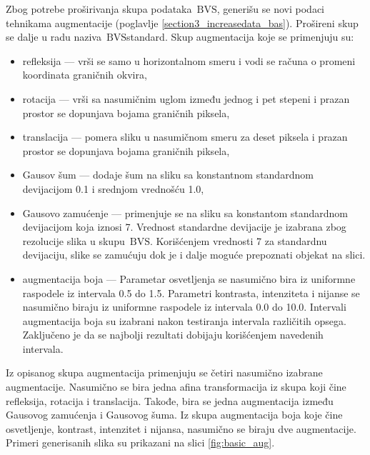 \documentclass[12pt,oneside]{memoir}
\newcommand{\bvs}{\ensuremath{\,\textrm{BVS}}}
\begin{document}
Zbog potrebe proširivanja skupa podataka \bvs, generišu se novi podaci tehnikama augmentacije (poglavlje \ref{section3_increasedata_bas}). Prošireni skup se dalje u radu naziva \bvs{standard}.
Skup augmentacija koje se primenjuju su: 
\begin{itemize}
    \item refleksija --- vrši se samo u horizontalnom smeru i vodi se računa o promeni koordinata graničnih okvira, 
    \item rotacija --- vrši sa nasumičnim uglom između jednog i pet stepeni i prazan prostor se dopunjava bojama graničnih piksela,
    \item translacija ---  pomera sliku u nasumičnom smeru za deset piksela i prazan prostor se dopunjava bojama graničnih piksela,
    \item Gausov šum --- dodaje šum na sliku sa konstantnom standardnom devijacijom 0.1 i srednjom vrednošću 1.0,
    \item Gausovo zamućenje --- primenjuje se na sliku sa konstantom standardnom devijacijom koja iznosi 7. Vrednost standardne devijacije je izabrana zbog rezolucije slika u skupu \bvs. Korišćenjem vrednosti 7 za standardnu devijaciju, slike se zamućuju dok je i dalje moguće prepoznati objekat na slici.
    \item augmentacija boja --- Parametar osvetljenja se nasumično bira iz uniformne raspodele iz intervala 0.5 do 1.5. Parametri kontrasta, intenziteta i nijanse se nasumično biraju iz uniformne raspodele iz intervala 0.0 do 10.0. Intervali augmentacija boja su izabrani nakon testiranja intervala različitih opsega. Zaključeno je da se najbolji rezultati dobijaju korišćenjem navedenih intervala.
\end{itemize}

\noindent Iz opisanog skupa augmentacija primenjuju se četiri nasumično izabrane augmentacije. Nasumično se bira jedna afina transformacija iz skupa koji čine refleksija, rotacija i translacija. Takođe, bira se jedna augmentacija između Gausovog zamućenja i Gausovog šuma. Iz skupa augmentacija boja koje čine osvetljenje, kontrast, intenzitet i nijansa, nasumično se biraju dve augmentacije. Primeri generisanih slika su prikazani na slici \ref{fig:basic_aug}.
\end{document}
